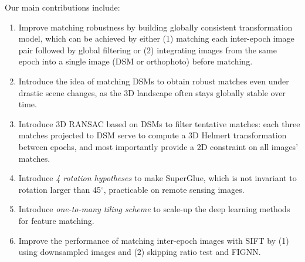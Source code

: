 Our main contributions include:\\
\begin{enumerate}
	\item Improve matching robustness by building globally consistent transformation model, which can be achieved by either (1) matching each inter-epoch image pair followed by global filtering or (2) integrating images from the same epoch into a single image (DSM or orthophoto) before matching.
	\item Introduce the idea of matching DSMs to obtain robust matches even under drastic scene changes, as the 3D landscape often stays globally stable over time.
	\item Introduce 3D RANSAC based on DSMs to filter tentative matches: each three matches projected to DSM serve to compute a 3D Helmert transformation between epochs, and most importantly provide a 2D constraint on all images’ matches.
	\item Introduce \textit{4 rotation hypotheses} to make SuperGlue, which is not invariant to rotation larger than 45$^\circ$, practicable on remote sensing images.
	\item Introduce \textit{one-to-many tiling scheme} to scale-up the deep learning methods for feature matching.
	\item Improve the performance of matching inter-epoch images with SIFT by (1) using downsampled images and (2) skipping ratio test and FIGNN.
\end{enumerate}



